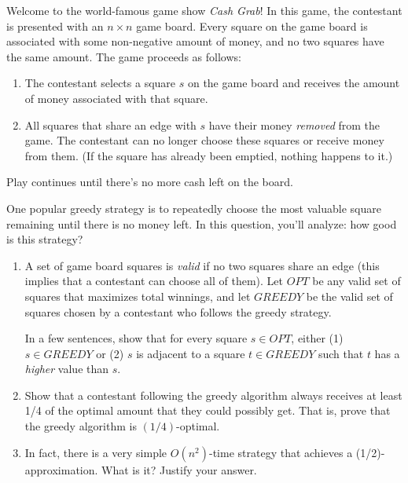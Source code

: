 \documentclass[12 pt, letterpaper]{hmcpset}
\begin{document}
\begin{problem}
	Welcome to the world-famous game show \emph{Cash Grab}! In this game, the contestant is presented with an $n \times n$ game board. Every square on the game board is associated with some non-negative amount of money, and no two squares have the same amount. The game proceeds as follows:
\begin{enumerate}
    \item The contestant selects a square $s$ on the game board and receives the amount of money associated with that square.
    \item All squares that share an edge with $s$ have their money \emph{removed} from the game. The contestant can no longer choose these squares or receive money from them. (If the square has already been emptied, nothing happens to it.) 
\end{enumerate}
Play continues until there's no more cash left on the board. 

\vspace{0.5cm}

One popular greedy strategy is to repeatedly choose the most valuable square remaining until there is no money left. In this question, you'll analyze: how good is this strategy?
\begin{enumerate}
    \item A set of game board squares is \emph{valid} if no two squares share an edge (this implies that a contestant can choose all of them). Let $OPT$ be any valid set of squares that maximizes total winnings, and let $GREEDY$ be the valid set of squares chosen by a contestant who follows the greedy strategy. 
    
    In a few sentences, show that for every square $s \in OPT$, either (1) $s \in GREEDY$ or (2) $s$ is adjacent to a square $t \in GREEDY$ such that $t$ has a \emph{higher} value than $s$.
    
    \item Show that a contestant following the greedy algorithm always receives at least 1/4 of the optimal amount that they could possibly get. That is, prove that the greedy algorithm is $(1/4)$-optimal.

    \item In fact, there is a very simple $O(n^2)$-time strategy that achieves a (1/2)-approximation. What is it? Justify your answer.
\end{enumerate}
\end{problem}
\end{document}
